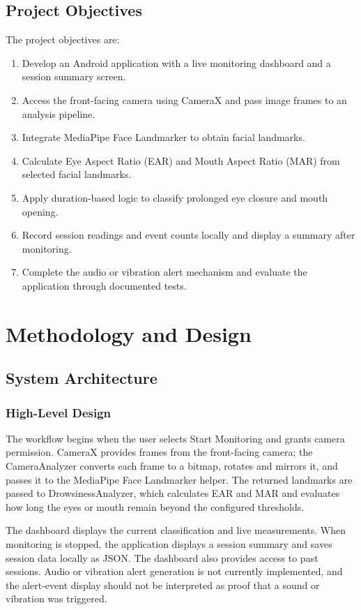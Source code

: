 \documentclass{tietreport}
\begin{document}
\section{Project Objectives}
The project objectives are:
\begin{enumerate}[label=\arabic*.]
  \item Develop an Android application with a live monitoring dashboard and a session summary screen.
  \item Access the front-facing camera using CameraX and pass image frames to an analysis pipeline.
  \item Integrate MediaPipe Face Landmarker to obtain facial landmarks.
  \item Calculate Eye Aspect Ratio (EAR) and Mouth Aspect Ratio (MAR) from selected facial landmarks.
  \item Apply duration-based logic to classify prolonged eye closure and mouth opening.
  \item Record session readings and event counts locally and display a summary after monitoring.
  \item Complete the audio or vibration alert mechanism and evaluate the application through documented tests.
\end{enumerate}

\chapter{Methodology and Design}

\section{System Architecture}

\subsection{High-Level Design}
The workflow begins when the user selects Start Monitoring and grants camera permission. CameraX provides frames from the front-facing camera; the CameraAnalyzer converts each frame to a bitmap, rotates and mirrors it, and passes it to the MediaPipe Face Landmarker helper. The returned landmarks are passed to DrowsinessAnalyzer, which calculates EAR and MAR and evaluates how long the eyes or mouth remain beyond the configured thresholds.

The dashboard displays the current classification and live measurements. When monitoring is stopped, the application displays a session summary and saves session data locally as JSON. The dashboard also provides access to past sessions. Audio or vibration alert generation is not currently implemented, and the alert-event display should not be interpreted as proof that a sound or vibration was triggered.
\end{document}
